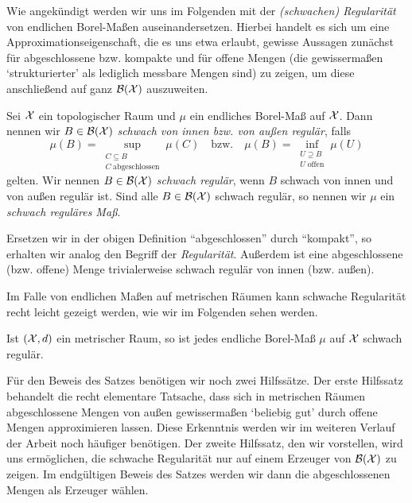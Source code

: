 \documentclass[../main/main.tex]{subfiles}
\begin{document}
	Wie angekündigt werden wir uns im Folgenden mit der \emph{(schwachen) Regularität} von endlichen Borel-Maßen auseinandersetzen. 
	Hierbei handelt es sich um eine Approximationseigenschaft, die es uns etwa erlaubt, gewisse Aussagen 
	zunächst für abgeschlossene bzw. kompakte und für offene Mengen (die gewissermaßen \enquote*{strukturierter} als lediglich messbare Mengen sind) zu zeigen, 
	um diese anschließend auf ganz $\mathcal{B}(\mathcal{X})$ auszuweiten. 
	
	\begin{Definition}
		\label{def:schwache_regularität}
		Sei $\mathcal{X}$ ein topologischer Raum und $\mu$ ein endliches Borel-Maß auf $\mathcal{X}$. 
		Dann nennen wir $B \in \mathcal{B}(\mathcal{X})$ \emph{schwach von 
			innen bzw. von außen regulär}, falls
		$$\mu(B) = \sup_{\substack{C \subseteq B \\ C \; \text{abgeschlossen}}} \mu(C) 
		\quad \text{bzw.} \quad \mu(B) = \inf_{\substack{U \supseteq B \\ U \; \text{offen}}} 
		\mu(U)$$
		gelten. Wir nennen $B \in \mathcal{B}(\mathcal{X})$ \emph{schwach regulär}, wenn $B$ schwach von innen und 
		von außen regulär ist. Sind alle $B \in \mathcal{B}(\mathcal{X})$ schwach regulär, 
		so nennen wir $\mu$ ein \emph{schwach reguläres Maß}.
	\end{Definition}
	
	\begin{Bemerkung}
		Ersetzen wir in der obigen Definition \enquote{abgeschlossen} durch \enquote{kompakt}, 
		so erhalten wir analog den Begriff der \emph{Regularität}. 
		Außerdem ist eine abgeschlossene (bzw. offene) Menge trivialerweise schwach regulär von innen (bzw. außen).
	\end{Bemerkung}
	
	Im Falle von endlichen Maßen auf metrischen Räumen kann schwache Regularität 
	recht leicht gezeigt werden, wie wir im Folgenden sehen werden.
	
	\begin{Satz}
		\label{satz:schwache_regularität}
		Ist $(\mathcal{X}, d)$ ein metrischer Raum, so ist jedes endliche Borel-Maß $\mu$ auf $\mathcal{X}$ schwach regulär.
	\end{Satz}
	
	Für den Beweis des Satzes benötigen wir noch zwei Hilfssätze. 
	Der erste Hilfssatz behandelt die recht elementare Tatsache, dass sich in metrischen Räumen 
	abgeschlossene Mengen von außen gewissermaßen \enquote*{beliebig gut} durch offene Mengen approximieren lassen. 
	Diese Erkenntnis werden wir im weiteren Verlauf der Arbeit noch häufiger benötigen.
	Der zweite Hilfssatz, den wir vorstellen,
	wird uns ermöglichen, die schwache Regularität nur auf einem Erzeuger von $\mathcal{B}(\mathcal{X})$ 
	zu zeigen. Im endgültigen Beweis des Satzes werden wir dann die abgeschlossenen Mengen als Erzeuger wählen.
	
\end{document}
